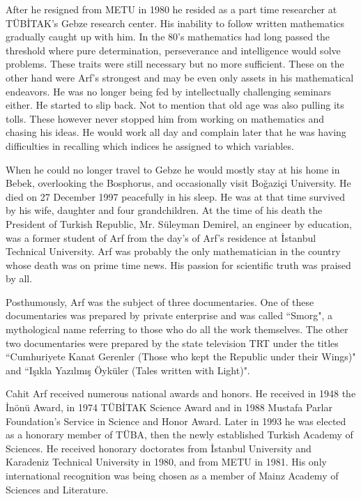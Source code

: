 \documentclass[12pt]{amsart}
\begin{document}
After he resigned from  METU in 1980 he resided as a part time researcher at T\"{U}B{\.I}TAK's Gebze research center.
His inability to follow written mathematics  gradually caught up with him. In the 80's mathematics had long passed the threshold  where pure determination, perseverance and intelligence would solve problems. These traits were still necessary but no more sufficient. These on the other hand were Arf's strongest and may be even only assets in his mathematical endeavors. He was no longer  being fed by intellectually challenging seminars either. He started to slip back. Not to mention that old age was also pulling its tolls.  These however never stopped him from working on mathematics and chasing his ideas. He would work all day and complain later that he was having difficulties in recalling which indices he assigned to which variables.

When he could no longer travel to Gebze he would mostly stay at his home in Bebek, overlooking the Bosphorus, and occasionally visit Bo\u{g}azi\c{c}i University. He died on 27 December 1997 peacefully in his sleep. He was at that time survived by his wife, daughter and four grandchildren.
At the time of his death the President of Turkish Republic,
Mr. S\"{u}leyman Demirel, an engineer by education,
was a former student of Arf from the day's of Arf's residence at {\.I}stanbul Technical University. Arf was probably the only mathematician in the country
whose death was on prime time news.  His passion for scientific truth
was praised by all.

Posthumously, Arf was the subject of
three documentaries. One of these documentaries was prepared by private enterprise and was called ``Smorg", a mythological name referring to those who do all the work themselves. The other two documentaries were prepared by the state television TRT under the titles ``Cumhuriyete Kanat Gerenler (Those who kept the Republic under their Wings)" and ``I\c{s}{\i}kla Yaz{\i}lm{\i}\c{s} \"{O}yk\"{u}ler (Tales written with Light)".

Cahit Arf received numerous national awards and honors.
He received in 1948  the {\.I}n\"{o}n\"{u} Award,
in 1974  T\"{U}B{\.I}TAK Science Award and in 1988 Mustafa Parlar Foundation's Service in Science and Honor Award. Later in 1993  he was elected as a honorary member of T\"{U}BA, then the newly established Turkish Academy of Sciences.  He received honorary doctorates from {\.I}stanbul University and Karadeniz Technical University in 1980, and from METU in 1981. His only international recognition was being chosen as a member of Mainz Academy of Sciences and Literature.
\end{document}
